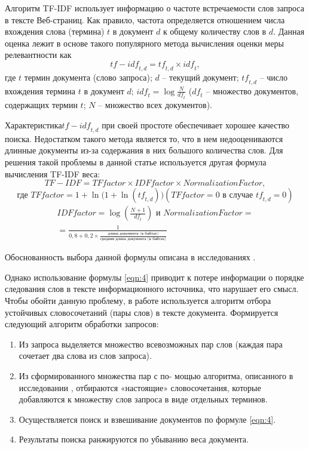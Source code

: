 Алгоритм TF-IDF использует информацию о частоте встречаемости слов запроса в тексте Веб-страниц. Как правило, частота определяется отношением числа вхождения слова (термина) \(t\) в документ \(d\) к общему количеству слов в \(d\). Данная оценка лежит в основе такого популярного метода вычисления оценки меры релевантности как
\begin{equation}
	\label{eqn:3}
	\textit{tf} - \textit{idf}_{t, d} = \textit{tf}_{t, d} \times \textit{idf}_t ,
\end{equation} 
где \(t\) термин документа (слово запроса); \(d\) -- текущий документ; \(\textit{tf}_{t, d}\) -- число вхождения термина \(t\) в документ \(d\); \( \textit{idf}_t = \log{\frac{N}{ \textit{df}_t}}\) (\( \textit{df}_t\) – множество документов, содержащих термин \(t\); \(N\) -- множество всех документов).

Характеристика\(\textit{tf} - \textit{idf}_{t, d}\) при своей простоте обеспечивает хорошее качество поиска. Недостатком такого метода является то, что в нем недооцениваются длинные документы из-за содержания в них большого количества слов. Для решения такой проблемы в данной статье используется другая формула вычисления TF-IDF веса:
\begin{equation}
	\label{eqn:4}
	\textit{TF} - \textit{IDF} = \textit{TFfactor} \times \textit{IDFfactor} \times \textit{NormalizationFactor},
\end{equation}
\[
\text{где } \textit{TFfactor} = 1 + \ln{(1 + \ln(\textit{tf}_{t, d})}) (\textit{TFfactor} = 0 \text{ в случае } \textit{tf}_{t, d} = 0)
\]
\begin{multline}
	\textit{IDFfactor} = \log{(\frac{N + 1}{\textit{df}_t})} \text{ и } \textit{NormalizationFactor} = \\
	=  \frac{1}{0,8 + 0,2 \times \frac{\textit{длина документа (в байтах)}}{\textit{средняя длина документа (в байтах)}}}
\end{multline}

Обоснованность выбора данной формулы описана в исследованиях \cite{SinghalKaszkiel}.

Однако использование формулы \cref{eqn:4} приводит к потере информации о порядке следования слов в тексте информационного источника, что нарушает его смысл. Чтобы обойти данную проблему, в работе используется алгоритм отбора устойчивых словосочетаний (пары слов) \cite{Gubin} в тексте документа. Формируется следующий алгоритм обработки запросов:
\begin{enumerate}
	\item Из запроса выделяется множество всевозможных пар слов (каждая пара сочетает два слова из слов запроса).
	\item Из сформированного множества пар с по- мощью алгоритма, описанного в исследовании \cite{Gubin}, отбираются «настоящие» словосочетания, которые добавляются к множеству слов запроса в виде отдельных терминов.
	\item Осуществляется поиск и взвешивание документов по формуле \cref{eqn:4}.
	\item Результаты поиска ранжируются по убыванию веса документа.
\end{enumerate}

